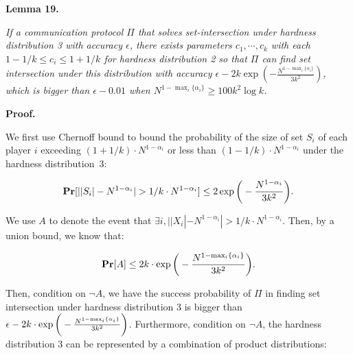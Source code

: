 

\par\medskip\noindent\textbf{
\textbf{Lemma 19}\textbf{.}
}\par



\emph{If a communication protocol $\Pi$ that solves set-intersection under hardness distribution 3 with accuracy $\epsilon$, there exists parameters $c_{1},\cdots,c_{k}$ with each $1-1/k\leq c_{i}\leq 1+1/k$ for hardness distribution 2 so that $\Pi$ can find set intersection under this distribution with accuracy $\epsilon-2k\mathop{\exp}(-\frac{N^{1-\mathop{\max}_{i}\{\alpha_{i}\}}}{3k^{2}})$, which is bigger than $\epsilon-0.01$ when $N^{1-\mathop{\max}_{i}\{\alpha_{i}\}}\geq 100k^{2}\log k$.}\par






\par\medskip\noindent\textbf{Proof.}\par




We first use Chernoff bound to bound the probability of the size of set $S_{i}$ of each player $i$ exceeding $(1+1/k)\cdot N^{1-\alpha_{i}}$ or less than $(1-1/k)\cdot N^{1-\alpha_{i}}$ under the hardness distribution 3:\par


\[\begin{gathered}
\displaystyle\operatorname*{\mathbf{Pr}}[||S_{i}|-N^{1-\alpha_{i}}|>1/k\cdot N^{1-\alpha_{i}}]\leq 2\exp\bigg{(}-\frac{N^{1-\alpha_{i}}}{3k^{2}}\bigg{)}.
\end{gathered}\]


We use $A$ to denote the event that $\exists i,||X_{i}|-N^{1-\alpha_{i}}|>1/k\cdot N^{1-\alpha_{i}}$. Then, by a union bound, we know that:\par


\[\begin{gathered}
\operatorname*{\mathbf{Pr}}[A]\leq 2k\cdot\exp\bigg{(}-\frac{N^{1-\mathop{\max}_{i}\{\alpha_{i}\}}}{3k^{2}}\bigg{)}.
\end{gathered}\]


Then, condition on $\neg A$, we have the success probability of $\Pi$ in finding set intersection under hardness distribution 3 is bigger than $\epsilon-2k\cdot\exp\bigg{(}-\frac{N^{1-\mathop{\max}_{i}\{\alpha_{i}\}}}{3k^{2}}\bigg{)}$. Furthermore, condition on $\neg A$, the hardness distribution 3 can be represented by a combination of product distributions:\par


